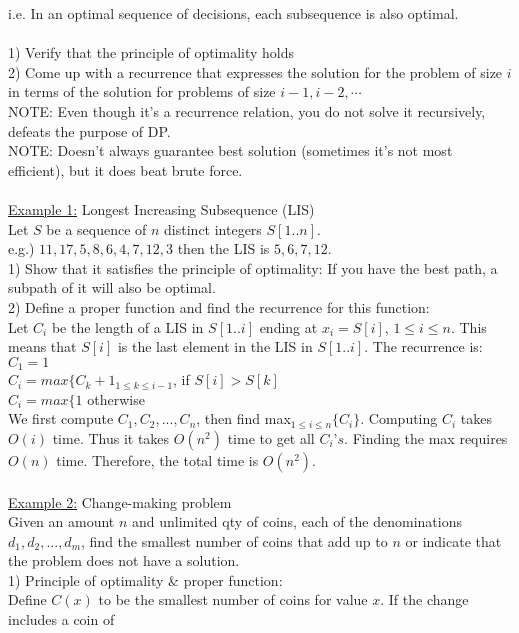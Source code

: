 \documentclass[8pt,letterpaper,twocolumn]{article}
\begin{document}
i.e. In an optimal sequence of decisions, each subsequence is also optimal.\\
\\
1) Verify that the principle of optimality holds\\
2) Come up with a recurrence that expresses the solution for the problem of size $i$ in terms of the solution for problems of size $i-1,i-2,\cdots$\\
NOTE: Even though it's a recurrence relation, you do not solve it recursively, defeats the purpose of DP.\\
NOTE: Doesn't always guarantee best solution (sometimes it's not most efficient), but it does beat brute force.\\
\\
\underline{Example 1:} Longest Increasing Subsequence (LIS)\\
Let $S$ be a sequence of $n$ distinct integers $S[1..n]$.\\
e.g.) $11, 17, 5, 8, 6, 4, 7, 12, 3$ then the LIS is $5,6,7,12$.\\
1) Show that it satisfies the principle of optimality:
If you have the best path, a subpath of it will also be optimal.\\
2) Define a proper function and find the recurrence for this function:\\
Let $C_i$ be the length of a LIS in $S[1..i]$ ending at $x_i = S[i]$, $1 \leq i \leq n$.
This means that $S[i]$ is the last element in the LIS in $S[1..i]$. The recurrence is:\\
$C_1 = 1$\\
$C_i = max\{C_k + 1_{1 \leq k \leq i−1}$, if $S[i] > S[k]$\\
$C_i = max\{1$ otherwise\\
We first compute $C_1,C_2,...,C_n$, then find max$_{1 \leq i \leq n} \{C_i\}$.
Computing $C_i$ takes $O(i)$ time. Thus it takes $O(n^2)$ time to get all $C_i’s$.
Finding the max requires $O(n)$ time. Therefore, the total time is $O(n^2)$.\\
\\
\underline{Example 2:} Change-making problem\\
Given an amount $n$ and unlimited qty of coins, each of the denominations $d_1,d_2,...,d_m$,
find the smallest number of coins that add up to $n$ or indicate that the problem does not have a solution.\\
1) Principle of optimality \& proper function:\\
Define $C(x)$ to be the smallest number of coins for value $x$. If the change includes a coin of
\end{document}
